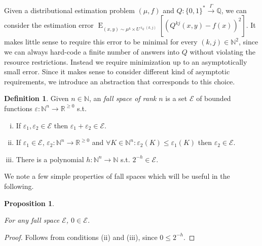 \documentclass{article}
\theoremstyle{definition}
\newtheorem{definition}{Definition}[section]
\theoremstyle{plain}
\newtheorem{proposition}{Proposition}[section]
\newcommand{\Words}{{\{ 0, 1 \}^*}}
\DeclareMathOperator{\E}{E}
\DeclareMathOperator{\R}{r}
\newcommand{\Nats}{\mathbb{N}}
\newcommand{\Rats}{\mathbb{Q}}
\newcommand{\Reals}{\mathbb{R}}
\begin{document}
Given a distributional estimation problem $(\mu,f)$ and $Q: \Words \xrightarrow{\Gamma} \Rats$, we can consider the estimation error $\E_{(x,y) \sim \mu^k \times U^{\R_Q(k,j)}}[(Q^{kj}(x,y) - f(x))^2]$. It makes little sense to require this error to be minimal for every $(k,j) \in \Nats^2$, since we can always hard-code a finite number of answers into $Q$ without violating the resource restrictions. Instead we require minimization up to an asymptotically small error. Since it makes sense to consider different kind of asymptotic requirements, we introduce an abstraction that corresponds to this choice.

\begin{definition}

Given $n \in \Nats$, an \emph{fall space of rank $n$} is a set $\mathcal{E}$ of bounded functions $\varepsilon: \Nats^n \rightarrow \Reals^{\geq 0}$ s.t.

\begin{enumerate}[(i)]

\item If $\varepsilon_1, \varepsilon_2 \in \mathcal{E}$ then $\varepsilon_1 + \varepsilon_2 \in \mathcal{E}$.

\item If $\varepsilon_1 \in \mathcal{E}$, $\varepsilon_2: \Nats^n \rightarrow \Reals^{\geq 0}$ and $\forall K \in \Nats^n: \varepsilon_2(K) \leq \varepsilon_1(K)$ then $\varepsilon_2 \in \mathcal{E}$.

\item There is a polynomial $h: \Nats^n \rightarrow \Nats$ s.t. $2^{-h} \in \mathcal{E}$.

\end{enumerate}

\end{definition}

We note a few simple properties of fall spaces which will be useful in the following.

\begin{proposition}
\label{prp:err_spc_zero}

For any fall space $\mathcal{E}$, $0 \in \mathcal{E}$.

\end{proposition}

\begin{proof}

Follows from conditions (ii) and (iii), since $0 \leq 2^{-h}$.

\end{proof}
\end{document}
